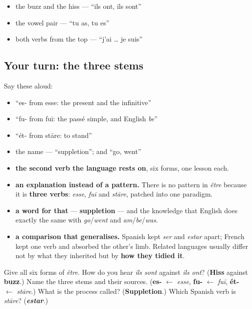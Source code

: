 \begin{itemize}
\raggedright
  \item the buzz and the hiss — \textquotedblleft{}ils ont, ils sont\textquotedblright{}
  \item the vowel pair — \textquotedblleft{}tu as, tu es\textquotedblright{}
  \item both verbs from the top — \textquotedblleft{}j'ai … je suis\textquotedblright{}
\end{itemize}

\subsection*{Your turn: the three stems}
Say these aloud:

\begin{itemize}
\raggedright
  \item \textquotedblleft{}es- from esse: the present and the infinitive\textquotedblright{}
  \item \textquotedblleft{}fu- from fuī: the passé simple, and English \emph{be}\textquotedblright{}
  \item \textquotedblleft{}ét- from stāre: to stand\textquotedblright{}
  \item the name — \textquotedblleft{}suppletion\textquotedblright{}; and \textquotedblleft{}go, went\textquotedblright{}
\end{itemize}

\begin{grammarlens}[title={What you've built this chapter}]
\begin{itemize}
\raggedright
  \item \textbf{the second verb the language rests on}, six forms, one lesson each.
  \item \textbf{an explanation instead of a pattern.} There is no pattern in \emph{être} because it is \textbf{three verbs}: \emph{esse}, \emph{fuī} and \emph{stāre}, patched into one paradigm.
  \item \textbf{a word for that} — \textbf{suppletion} — and the knowledge that English does exactly the same with \emph{go}/\emph{went} and \emph{am}/\emph{be}/\emph{was}.
  \item \textbf{a comparison that generalises.} Spanish kept \emph{ser} and \emph{estar} apart; French kept one verb and absorbed the other's limb. Related languages usually differ not by what they inherited but by \textbf{how they tidied it}.
\end{itemize}
\end{grammarlens}

\begin{tcolorbox}[breakable,colback=teal!4,colframe=teal!35!black,title={Before you move on}]
Give all six forms of \emph{être}. How do you hear \emph{ils sont} against \emph{ils ont}? (\textbf{Hiss} against \textbf{buzz}.) Name the three stems and their sources. (\textbf{es-} $\leftarrow$ \emph{esse}, \textbf{fu-} $\leftarrow$ \emph{fuī}, \textbf{ét-} $\leftarrow$ \emph{stāre}.) What is the process called? (\textbf{Suppletion}.) Which Spanish verb is \emph{stāre}? (\emph{\textbf{estar}}.)
\end{tcolorbox}
